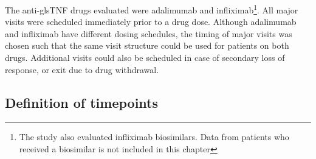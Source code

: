 \begin{outline}
The anti-gls{TNF} drugs evaluated were adalimumab and infliximab\footnote{The study also evaluated infliximab biosimilars. Data from patients who received a biosimilar is not included in this chapter}.
All major visits were scheduled immediately prior to a drug dose.
Although adalimumab and infliximab have different dosing schedules, the timing of major visits was chosen such that the same visit structure could be used for patients on both drugs.
Additional visits could also be scheduled in case of secondary loss of response, or exit due to drug withdrawal.


\subsection{Definition of timepoints}
\label{subsubsec:multiPANTS_timepoints_def}


\end{outline}
